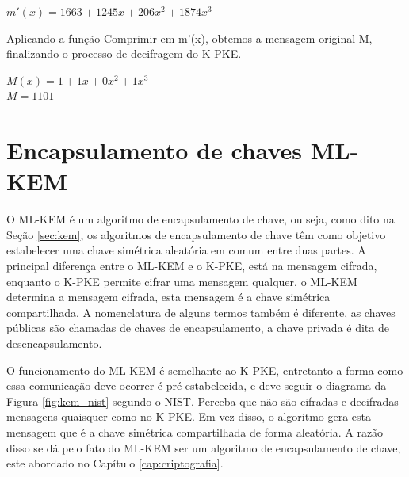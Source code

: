    \begin{center}
        $m'(x) = 1663 + 1245 x + 206 x^2 + 1874 x^3$
    \end{center}

    Aplicando a função Comprimir em m'(x), obtemos a mensagem original M, finalizando o processo de decifragem do K-PKE.

    \begin{center}
        $M(x) = 1 + 1 x + 0 x^2 + 1 x^3$ \\
        $M = 1101$
    \end{center}
    

\section{Encapsulamento de chaves ML-KEM}
\label{sec:ml-kem}
    O \ac{ML-KEM} é um algoritmo de encapsulamento de chave, ou seja, como dito na Seção \ref{sec:kem}, os algoritmos de encapsulamento de chave têm como objetivo estabelecer uma chave simétrica aleatória em comum entre duas partes. A principal diferença entre o \ac{ML-KEM} e o K-PKE, está na mensagem cifrada, enquanto o K-PKE permite cifrar uma mensagem qualquer, o \ac{ML-KEM} determina a mensagem cifrada, esta mensagem é a chave simétrica compartilhada. A nomenclatura de alguns termos também é diferente, as chaves públicas são chamadas de chaves de encapsulamento, a chave privada é dita de desencapsulamento.

    O funcionamento do \ac{ML-KEM} é semelhante ao K-PKE, entretanto a forma como essa comunicação deve ocorrer é pré-estabelecida, e deve seguir o diagrama da Figura \ref{fig:kem_nist} segundo o \ac{NIST}. Perceba que não são cifradas e decifradas mensagens quaisquer como no K-PKE. Em vez disso, o algoritmo gera esta mensagem que é a chave simétrica compartilhada de forma aleatória. A razão disso se dá pelo fato do \ac{ML-KEM} ser um algoritmo de encapsulamento de chave, este abordado no Capítulo \ref{cap:criptografia}.

